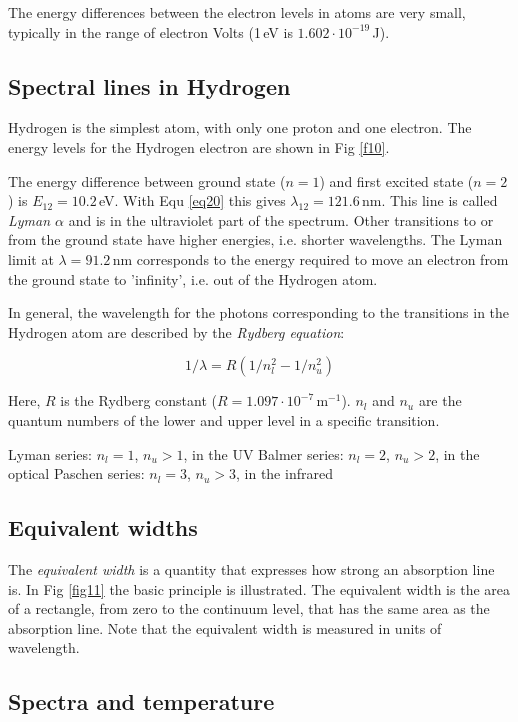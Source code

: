 The energy differences between the electron levels in atoms are very small, typically in the range of electron Volts (1\,eV is $1.602 \cdot 10^{-19}$\,J).

\subsection{Spectral lines in Hydrogen}

Hydrogen is the simplest atom, with only one proton and one electron. The energy levels for the Hydrogen electron are shown in Fig \ref{f10}.

The energy difference between ground state ($n=1$) and first excited state  ($n=2$) is $E_{12} = 10.2$\,eV. With Equ \eqref{eq20} this gives $\lambda_{12} = 121.6$\,nm. This line is called \textit{Lyman $\alpha$} and is in the ultraviolet part of the spectrum. Other transitions to or from the ground state have higher energies, i.e. shorter wavelengths. The Lyman limit at $\lambda = 91.2$\,nm corresponds to the energy required to move an electron from the ground state to 'infinity', i.e. out of the Hydrogen atom.

In general, the wavelength for the photons corresponding to the transitions in the Hydrogen atom are described by the \textit{Rydberg equation}:

\begin{equation}
1/\lambda = R (1/n_l^2 - 1/n_u^2)
\label{eq21}
\end{equation}

Here, $R$ is the Rydberg constant ($R = 1.097 \cdot 10^{-7}$\,m$^{-1}$). $n_l$ and $n_u$ are the quantum numbers of the lower and upper level in a specific transition.

Lyman series: $n_l = 1$, $n_u >1$, in the UV
Balmer series: $n_l = 2$, $n_u >2$, in the optical
Paschen series: $n_l = 3$, $n_u >3$, in the infrared

\subsection{Equivalent widths}

The \textit{equivalent width} is a quantity that expresses how strong an absorption line is. In Fig \ref{fig11} the basic principle is illustrated. The equivalent width is the area of a rectangle, from zero to the continuum level, that has the same area as the absorption line. Note that the equivalent width is measured in units of wavelength.

\subsection{Spectra and temperature}

